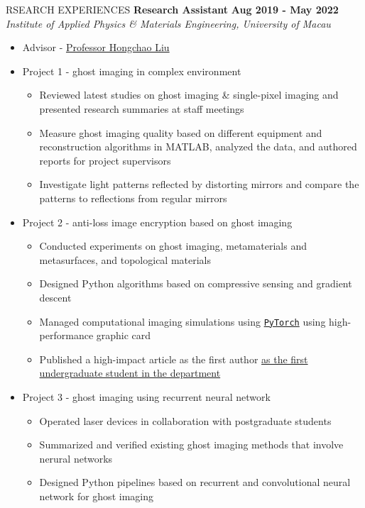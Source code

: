 \documentclass[10pt]{article} %
\begin{document}
\begin{section}{RSEARCH EXPERIENCES}
\textbf{Research Assistant} \hfill \textbf{Aug 2019 - May 2022} \\
\textit{Institute of Applied Physics \& Materials Engineering, University of Macau}
\begin{itemize}[leftmargin=1.5em]
    \item Advisor - \href{mailto:hcliu@um.edu.mo}{Professor Hongchao Liu}
    \item Project 1 - ghost imaging in complex environment %
    \begin{itemize}[leftmargin=1.5em]
        \item Reviewed latest studies on ghost imaging \& single-pixel imaging and presented research summaries at staff meetings
        \item Measure ghost imaging quality based on different equipment and reconstruction algorithms in MATLAB, analyzed the data, and authored reports for project supervisors
        \item Investigate light patterns reflected by distorting mirrors and compare the patterns to reflections from regular mirrors
    \end{itemize}
    \item Project 2 - anti-loss image encryption based on ghost imaging %
    \begin{itemize}[leftmargin=1.5em]
        \item Conducted experiments on ghost imaging, metamaterials and metasurfaces, and topological materials
        \item Designed Python algorithms based on compressive sensing and gradient descent
        \item Managed computational imaging simulations using \href{https://pytorch.org/}{\texttt{PyTorch}} using high-performance graphic card
        \item Published a high-impact article as the first author \href{https://www.tdm.com.mo/en/news-detail/683438?isvideo=false&lang=en&category=all}{as the first undergraduate student in the department} 
    \end{itemize}
    \item Project 3 - ghost imaging using recurrent neural network %
    \begin{itemize}[leftmargin=1.5em]
        \item Operated laser devices in collaboration with postgraduate students
        \item Summarized and verified existing ghost imaging methods that involve nerural networks
        \item Designed Python pipelines based on recurrent and convolutional neural network for ghost imaging 
    \end{itemize}
\end{itemize}

\end{section}
\end{document}
